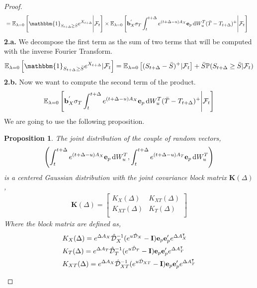 \documentclass[10pt,a4paper,reqno]{amsart}
\newtheorem{proposition}[theorem]{Proposition}
\theoremstyle{example}
\newcommand*\D{\mathop{}\!\textnormal{d}}
\newcommand{\opI}{\mathbf{I}}
\begin{document}
\begin{proof}
\begin{align}
    &=\mathbb{E}_{\lambda=0}\left[\mathbbm{1}_{S_{t+\Delta}\geq \Bar{S}} e^{X_{t+\Delta}}\Bigg|\mathcal{F}_t\right]\times\mathbb{E}_{\lambda=0}\left[\mathbf{b}_X^{'} \sigma_T \int_t^{t+\Delta} e^{(t+\Delta-u)A_X}\textbf{e}_p\D W_u^T(\Bar{T}-T_{t+\Delta})^+ \Bigg| \mathcal{F}_t\right]\nonumber
\end{align}
\textbf{2.a.} We decompose the first term as the sum of two terms that will be computed with the inverse Fourier Transform.
\begin{align}
    \mathbb{E}_{\lambda=0}\left[\mathbbm{1}_{S_{t+\Delta}\geq \Bar{S}} e^{X_{t+\Delta}}|\mathcal{F}_t\right]=\mathbb{E}_{\lambda=0}\left[(S_{t+\Delta}-\Bar{S})^+|\mathcal{F}_t\right]+\Bar{S}\mathbb{P}(S_{t+\Delta}\geq\Bar{S}|\mathcal{F}_t)\nonumber
\end{align}
\textbf{2.b.} Now we want to compute the second term of the product.
\begin{align}
    \mathbb{E}_{\lambda=0}\left[\mathbf{b}_X^{'} \sigma_T \int_t^{t+\Delta} e^{(t+\Delta-u)A_X}\textbf{e}_p\D W_u^T(\Bar{T}-T_{t+\Delta})^+ \Bigg| \mathcal{F}_t\right]\nonumber
\end{align}
We are going to use the following proposition.
\begin{proposition}
    The joint distribution of the couple of random vectors,
    \begin{align}
        \left(\int_t^{t+\Delta} e^{(t+\Delta-u)A_X}\textbf{e}_p\D W_u^T,\int_t^{t+\Delta} e^{(t+\Delta-u)A_T}\textbf{e}_p\D W_u^T\right)\nonumber
    \end{align}
    is a centered Gaussian distribution with the joint covariance block matrix $\textbf{K}(\Delta)$,
   \begin{align}
\textbf{K}(\Delta)=\begin{bmatrix}
K_X(\Delta) & K_{XT}(\Delta)  \\
K_{XT}(\Delta) & K_T(\Delta) \\
\end{bmatrix} \nonumber
   \end{align}
   Where the block matrix are defined as,
   \begin{align}
       &K_X(\Delta)=e^{\Delta A_X}\Hat{\mathcal{D}}_X^{-1}(e^{u\Hat{\mathcal{D}}_X}-\opI)\textbf{e}_p\textbf{e}_p'e^{\Delta A_X^\intercal} \nonumber\\
       &K_T(\Delta)=e^{\Delta A_T}\Hat{\mathcal{D}}_T^{-1}(e^{u\Hat{\mathcal{D}}_T}-\opI)\textbf{e}_p\textbf{e}_p'e^{\Delta A_T^\intercal} \nonumber\\
       &K_{XT}(\Delta)=e^{\Delta A_X}\Hat{\mathcal{D}}_{XT}^{-1}(e^{u\Hat{\mathcal{D}}_{XT}}-\opI)\textbf{e}_p\textbf{e}_p'e^{\Delta A_T^\intercal} \nonumber

\end{align}
\end{proposition}
\end{proof}
\end{document}
